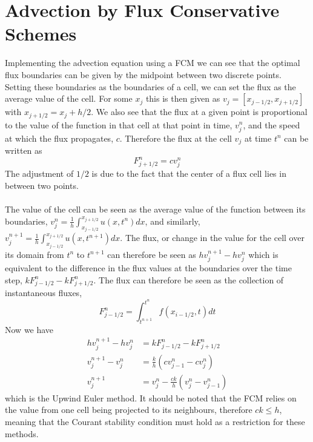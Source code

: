 \section{Advection by Flux Conservative Schemes}
Implementing the advection equation using a FCM we can see that the optimal flux boundaries can be given by the midpoint between two discrete points. Setting these boundaries as the boundaries of a cell, we can set the flux as the average value of the cell. For some $x_j$ this is then given as $v_j=[x_{j-1/2},x_{j+1/2}]$ with $x_{j+1/2} = x_j + h/2$. We also see that the flux at a given point is proportional to the value of the function in that cell at that point in time, $v_j^n$, and the speed at which the flux propagates, $c$. Therefore the flux at the cell $v_j$ at time $t^n$ can be written as
\begin{equation}\label{eq:adv_flux}
  F^n_{j+1/2} =cv^n_j
\end{equation}
The adjustment of $1/2$ is due to the fact that the center of a flux cell lies in between two points.
\\
\\
The value of the cell can be seen as the average value of the function between its boundaries, $v^n_j=\frac{1}{h}\int_{x_{j-1/2}}^{x_{j+1/2}}u(x,t^n)dx$, and similarly, $v^{n+1}_j=\frac{1}{h}\int_{x_{j-1/2}}^{x_{j+1/2}}u(x,t^{n+1})dx$. The flux, or change in the value for the cell over its domain from $t^n$ to $t^{n+1}$ can therefore be seen as $hv^{n+1}_j - hv^n_j$ which is equivalent to the difference in the flux values at the boundaries over the time step, $kF^n_{j-1/2} - kF^n_{j+1/2}$. The flux can therefore be seen as the collection of instantaneous fluxes,
\begin{equation*}
  F^n_{j-1/2} = \int_{t^{n+1}}^{t^n}f(x_{i-1/2},t)dt
\end{equation*}
Now we have
\begin{equation}\label{eq:flux_upwind}
\begin{aligned}
  hv^{n+1}_j - hv^n_j   &=  kF^n_{j-1/2} - kF^n_{j+1/2}\\
  v^{n+1}_j - v^n_j     &= \frac{k}{h}(cv^n_{j-1} - cv^n_j)\\
  v^{n+1}_j             &= v^n_j - \frac{ck}{h}(v^n_{j} - v^n_{j-1})
\end{aligned}
\end{equation}
which is the Upwind Euler method. It should be noted that the FCM relies on the value from one cell being projected to its neighbours, therefore $ck\leq h$, meaning that the Courant stability condition must hold as a restriction for these methods.
